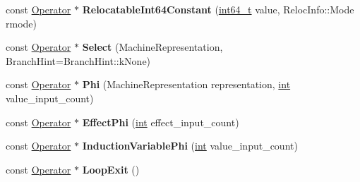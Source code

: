 \begin{DoxyCompactItemize}
\item 
\mbox{\label{classv8_1_1internal_1_1compiler_1_1CommonOperatorBuilder_a17a961b41118c0cf66f39e64f12f52b7}} 
const \mbox{\hyperlink{classv8_1_1internal_1_1compiler_1_1Operator}{Operator}} $\ast$ {\bfseries Relocatable\+Int64\+Constant} (\mbox{\hyperlink{classint64__t}{int64\+\_\+t}} value, Reloc\+Info\+::\+Mode rmode)
\item 
\mbox{\label{classv8_1_1internal_1_1compiler_1_1CommonOperatorBuilder_aa1c26747b9de7e0609e039c677cbf415}} 
const \mbox{\hyperlink{classv8_1_1internal_1_1compiler_1_1Operator}{Operator}} $\ast$ {\bfseries Select} (Machine\+Representation, Branch\+Hint=Branch\+Hint\+::k\+None)
\item 
\mbox{\label{classv8_1_1internal_1_1compiler_1_1CommonOperatorBuilder_a1554d7295b903ddb8ceefa684ca8fd21}} 
const \mbox{\hyperlink{classv8_1_1internal_1_1compiler_1_1Operator}{Operator}} $\ast$ {\bfseries Phi} (Machine\+Representation representation, \mbox{\hyperlink{classint}{int}} value\+\_\+input\+\_\+count)
\item 
\mbox{\label{classv8_1_1internal_1_1compiler_1_1CommonOperatorBuilder_a3e0b42241f674bd2a3a024edd67481d0}} 
const \mbox{\hyperlink{classv8_1_1internal_1_1compiler_1_1Operator}{Operator}} $\ast$ {\bfseries Effect\+Phi} (\mbox{\hyperlink{classint}{int}} effect\+\_\+input\+\_\+count)
\item 
\mbox{\label{classv8_1_1internal_1_1compiler_1_1CommonOperatorBuilder_a05d2e43a2465b8c6e609397ffba57d30}} 
const \mbox{\hyperlink{classv8_1_1internal_1_1compiler_1_1Operator}{Operator}} $\ast$ {\bfseries Induction\+Variable\+Phi} (\mbox{\hyperlink{classint}{int}} value\+\_\+input\+\_\+count)
\item 
\mbox{\label{classv8_1_1internal_1_1compiler_1_1CommonOperatorBuilder_a08b2ae6a07d8f8a72485b475020f585e}} 
const \mbox{\hyperlink{classv8_1_1internal_1_1compiler_1_1Operator}{Operator}} $\ast$ {\bfseries Loop\+Exit} ()

\end{DoxyCompactItemize}
